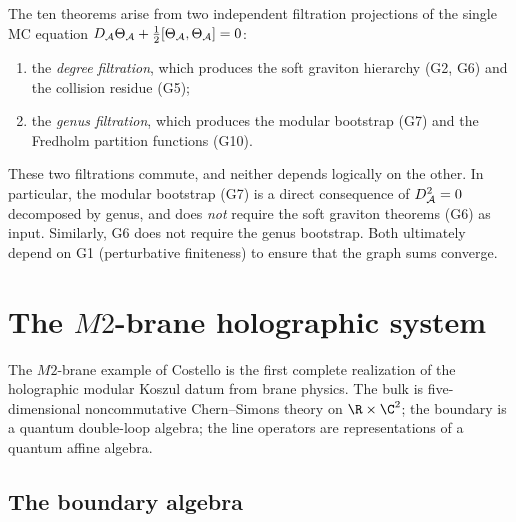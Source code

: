\begin{remark}
The ten theorems arise from two independent filtration projections
of the single MC equation $D_{\mathcal{A}}\Theta_{\mathcal{A}} + \frac{1}{2}[\Theta_{\mathcal{A}},
\Theta_{\mathcal{A}}] = 0$:
\begin{enumerate}[label=\textup{(\alph*)}]
\item the \emph{degree filtration}, which produces the soft graviton
 hierarchy (G2, G6) and the collision residue (G5);
\item the \emph{genus filtration}, which produces the modular bootstrap
 (G7) and the Fredholm partition functions (G10).
\end{enumerate}
These two filtrations commute, and neither depends logically on the
other. In particular, the modular bootstrap (G7) is a direct
consequence of $D_{\mathcal{A}}^2 = 0$ decomposed by genus, and does \emph{not}
require the soft graviton theorems (G6) as input. Similarly, G6
does not require the genus bootstrap. Both ultimately depend on G1
(perturbative finiteness) to ensure that the graph sums converge.
\end{remark}


%
%

\section{The \texorpdfstring{$M2$}{M2}-brane holographic system}

The $M2$-brane example of Costello is the first complete realization
of the holographic modular Koszul datum from brane physics. The
bulk is five-dimensional noncommutative Chern--Simons theory on
$\R \times \C^2$; the boundary is a quantum double-loop algebra;
the line operators are representations of a quantum affine algebra.

\subsection{The boundary algebra}

